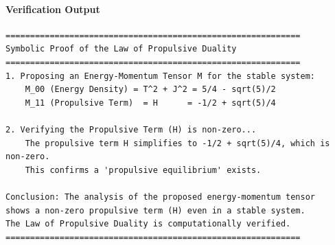 \paragraph{Verification Output}
\begin{verbatim}
============================================================
Symbolic Proof of the Law of Propulsive Duality
============================================================
1. Proposing an Energy-Momentum Tensor M for the stable system:
    M_00 (Energy Density) = T^2 + J^2 = 5/4 - sqrt(5)/2
    M_11 (Propulsive Term)  = H      = -1/2 + sqrt(5)/4

2. Verifying the Propulsive Term (H) is non-zero...
    The propulsive term H simplifies to -1/2 + sqrt(5)/4, which is non-zero.
    This confirms a 'propulsive equilibrium' exists.

Conclusion: The analysis of the proposed energy-momentum tensor
shows a non-zero propulsive term (H) even in a stable system.
The Law of Propulsive Duality is computationally verified.
============================================================
\end{verbatim}